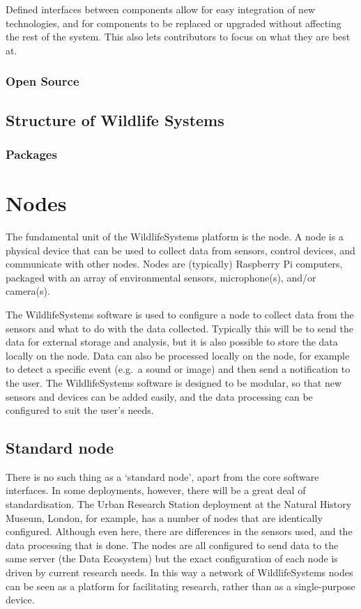 \documentclass[
]{book}
\begin{document}
Defined interfaces between components allow for easy integration of new technologies, and for components to be replaced or upgraded without affecting the rest of the system. This also lets contributors to focus on what they are best at.

\subsection{Open Source}\label{open-source}

\section{Structure of Wildlife Systems}\label{structure-of-wildlife-systems}

\subsection{Packages}\label{packages}

\chapter{Nodes}\label{nodes}

The fundamental unit of the WildlifeSystems platform is the node. A node is a physical device that can be used to collect data from sensors, control devices, and communicate with other nodes. Nodes are (typically) Raspberry Pi computers, packaged with an array of environmental sensors, microphone(s), and/or camera(s).

The WildlifeSystems software is used to configure a node to collect data from the sensors and what to do with the data collected. Typically this will be to send the data for external storage and analysis, but it is also possible to store the data locally on the node. Data can also be processed locally on the node, for example to detect a specific event (e.g.~a sound or image) and then send a notification to the user. The WildlifeSystems software is designed to be modular, so that new sensors and devices can be added easily, and the data processing can be configured to suit the user's needs.

\section{Standard node}\label{standard-node}

There is no such thing as a `standard node', apart from the core software interfaces. In some deployments, however, there will be a great deal of standardisation. The Urban Research Station deployment at the Natural History Museum, London, for example, has a number of nodes that are identically configured. Although even here, there are differences in the sensors used, and the data processing that is done. The nodes are all configured to send data to the same server (the Data Ecosystem) but the exact configuration of each node is driven by current research needs. In this way a network of WildlifeSystems nodes can be seen as a platform for facilitating research, rather than as a single-purpose device.
\end{document}
